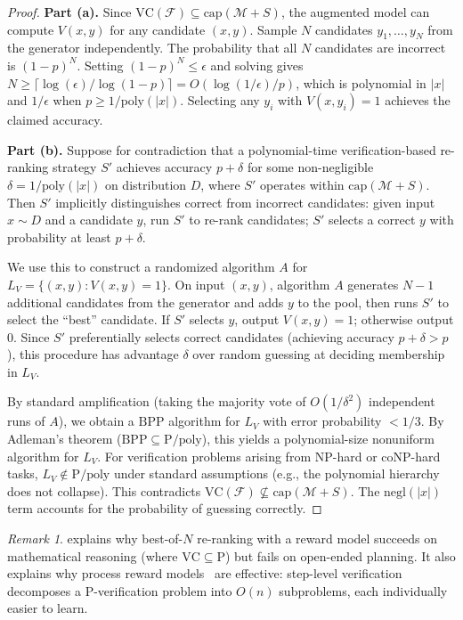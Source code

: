 \documentclass{article}
\theoremstyle{definition}
\theoremstyle{remark}
\newtheorem{remark}[theorem]{Remark}
\newcommand{\PTIME}{\mathrm{P}}
\newcommand{\NP}{\mathrm{NP}}
\newcommand{\coNP}{\mathrm{coNP}}
\newcommand{\BPP}{\mathrm{BPP}}
\newcommand{\VC}{\mathrm{VC}}           %
\newcommand{\calM}{\mathcal{M}}         %
\newcommand{\calF}{\mathcal{F}}         %
\newcommand{\poly}{\mathrm{poly}}
\newcommand{\negl}{\mathrm{negl}}
\begin{document}
\begin{proof}
\textbf{Part (a).}
Since $\VC(\calF) \subseteq \mathrm{cap}(\calM + S)$, the augmented model can compute $V(x, y)$ for any candidate $(x, y)$.
Sample $N$ candidates $y_1, \ldots, y_N$ from the generator independently.
The probability that all $N$ candidates are incorrect is $(1-p)^N$.
Setting $(1-p)^N \leq \epsilon$ and solving gives $N \geq \lceil \log(\epsilon) / \log(1-p) \rceil = O(\log(1/\epsilon) / p)$, which is polynomial in $|x|$ and $1/\epsilon$ when $p \geq 1/\poly(|x|)$.
Selecting any $y_i$ with $V(x, y_i) = 1$ achieves the claimed accuracy.

\textbf{Part (b).}
Suppose for contradiction that a polynomial-time verification-based re-ranking strategy $S'$ achieves accuracy $p + \delta$ for some non-negligible $\delta = 1/\poly(|x|)$ on distribution $D$, where $S'$ operates within $\mathrm{cap}(\calM + S)$.
Then $S'$ implicitly distinguishes correct from incorrect candidates: given input $x \sim D$ and a candidate $y$, run $S'$ to re-rank candidates; $S'$ selects a correct $y$ with probability at least $p + \delta$.

We use this to construct a randomized algorithm $A$ for $L_V = \{(x,y) : V(x,y) = 1\}$.
On input $(x,y)$, algorithm $A$ generates $N-1$ additional candidates from the generator and adds $y$ to the pool, then runs $S'$ to select the ``best'' candidate.
If $S'$ selects $y$, output $V(x,y) = 1$; otherwise output $0$.
Since $S'$ preferentially selects correct candidates (achieving accuracy $p + \delta > p$), this procedure has advantage $\delta$ over random guessing at deciding membership in $L_V$.

By standard amplification (taking the majority vote of $O(1/\delta^2)$ independent runs of $A$), we obtain a $\BPP$ algorithm for $L_V$ with error probability $< 1/3$.
By Adleman's theorem ($\BPP \subseteq \PTIME/\poly$), this yields a polynomial-size nonuniform algorithm for $L_V$.
For verification problems arising from $\NP$-hard or $\coNP$-hard tasks, $L_V \notin \PTIME/\poly$ under standard assumptions (e.g., the polynomial hierarchy does not collapse).
This contradicts $\VC(\calF) \not\subseteq \mathrm{cap}(\calM + S)$.
The $\negl(|x|)$ term accounts for the probability of guessing correctly.
\end{proof}

\begin{remark}
 explains why best-of-$N$ re-ranking with a reward model succeeds on mathematical reasoning (where $\VC \subseteq \PTIME$) but fails on open-ended planning.
It also explains why process reward models~\citep{lightman2023lets} are effective: step-level verification decomposes a $\PTIME$-verification problem into $O(n)$ subproblems, each individually easier to learn.
\end{remark}
\end{document}
